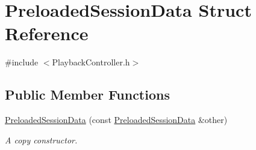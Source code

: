 \hypertarget{struct_preloaded_session_data}{\section{Preloaded\-Session\-Data Struct Reference}
\label{struct_preloaded_session_data}
}


{\ttfamily \#include $<$Playback\-Controller.\-h$>$}

\subsection*{Public Member Functions}
\begin{DoxyCompactItemize}
\item 
\hypertarget{struct_preloaded_session_data_a5124b957636fc874af75970202495de6}{\hyperlink{struct_preloaded_session_data_a5124b957636fc874af75970202495de6}{Preloaded\-Session\-Data} (const \hyperlink{struct_preloaded_session_data}{Preloaded\-Session\-Data} \&other)}\label{struct_preloaded_session_data_a5124b957636fc874af75970202495de6}

\begin{DoxyCompactList}\small\item\em A copy constructor. \end{DoxyCompactList}\end{DoxyCompactItemize}
